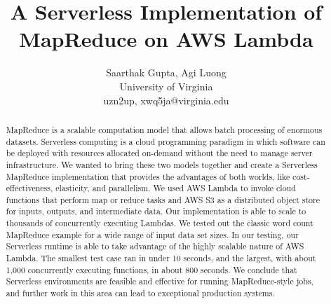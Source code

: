 \documentclass[letterpaper,twocolumn,10pt]{article}
\begin{document}

\date{}

\title{\Large \bf A Serverless Implementation of MapReduce on AWS Lambda}

\author{
	Saarthak Gupta, Agi Luong\\
	{University of Virginia}\\
	{uzn2up, xwq5ja}@virginia.edu
} 

\maketitle

\begin{abstract}
MapReduce is a scalable computation model that allows batch processing of enormous datasets. Serverless computing is a cloud programming paradigm in which software can be deployed with resources allocated on-demand without the need to manage server infrastructure. We wanted to bring these two models together and create a Serverless MapReduce implementation that provides the advantages of both worlds, like cost-effectiveness, elasticity, and parallelism. We used AWS Lambda to invoke cloud functions that perform map or reduce tasks and AWS S3 as a distributed object store for inputs, outputs, and intermediate data. Our implementation is able to scale to thousands of concurrently executing Lambdas. We tested out the classic word count MapReduce example for a wide range of input data set sizes. In our testing, our Serverless runtime is able to take advantage of the highly scalable nature of AWS Lambda. The smallest test case ran in under 10 seconds, and the largest, with about 1,000 concurrently executing functions, in about 800 seconds. We conclude that Serverless environments are feasible and effective for running MapReduce-style jobs, and further work in this area can lead to exceptional production systems.
\end{abstract}



% 


\end{document}
